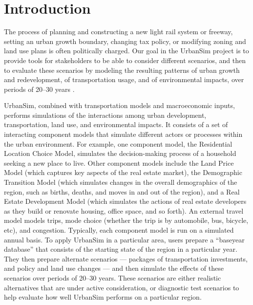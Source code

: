 
\section{Introduction}
\label{sec:introduction}

The process of planning and constructing a new light rail system or
freeway, setting an urban growth boundary, changing tax policy, or
modifying zoning and land use plans is often politically charged.  Our goal
in the UrbanSim project is to provide tools for stakeholders to be able to
consider different scenarios, and then to evaluate these scenarios by
modeling the resulting patterns of urban growth and redevelopment, of
transportation usage, and of environmental impacts, over periods of 20--30
years \cite{waddell-sscr-2004,waddell-ulfarsson-2004}.  

UrbanSim, combined with transportation models and macroeconomic inputs,
performs simulations of the interactions among urban development,
transportation, land use, and environmental impacts. It consists of a set
of interacting component models that simulate different actors or processes
within the urban environment.  For example, one component model, the
Residential Location Choice Model, simulates the decision-making process of
a household seeking a new place to live.  Other component models include
the Land Price Model (which captures key aspects of the real estate
market), the Demographic Transition Model (which simulates changes in the
overall demographics of the region, such as births, deaths, and moves in
and out of the region), and a Real Estate Development Model (which
simulates the actions of real estate developers as they build or renovate
housing, office space, and so forth).  An external travel model models
trips, mode choice (whether the trip is by automobile, bus, bicycle, etc),
and congestion.  Typically, each component model is run on a simulated
annual basis. To apply UrbanSim in a particular area, users 
prepare a ``baseyear database'' that consists of the starting state of the
region in a particular year.  They then prepare alternate scenarios ---
packages of transportation investments, and policy and land use changes ---
and then simulate the effects of these scenarios over periods of 20--30
years.  These scenarios are either realistic alternatives that are
under active consideration, or diagnostic test scenarios to
help evaluate how well UrbanSim performs on a particular region. 

